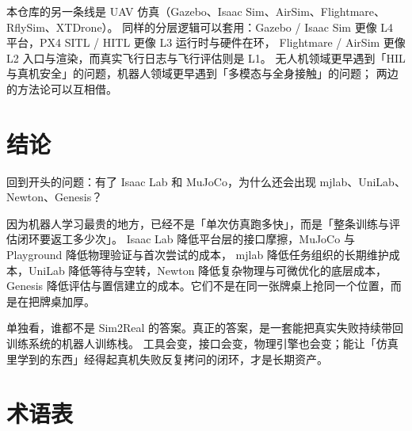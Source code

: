 \documentclass[UTF8, 11pt, a4paper, fontset=windows]{ctexart}
\begin{document}
本仓库的另一条线是 UAV 仿真（Gazebo、Isaac Sim、AirSim、Flightmare、RflySim、XTDrone）。
同样的分层逻辑可以套用：Gazebo / Isaac Sim 更像 L4 平台，PX4 SITL / HITL 更像 L3 运行时与硬件在环，
Flightmare / AirSim 更像 L2 入口与渲染，而真实飞行日志与飞行评估则是 L1。
无人机领域更早遇到「HIL 与真机安全」的问题，机器人领域更早遇到「多模态与全身接触」的问题；
两边的方法论可以互相借。

\section{结论}\label{sec:conclusion}

回到开头的问题：有了 Isaac Lab 和 MuJoCo，为什么还会出现 mjlab、UniLab、Newton、Genesis？

因为机器人学习最贵的地方，已经不是「单次仿真跑多快」，而是「整条训练与评估闭环要返工多少次」。
Isaac Lab 降低平台层的接口摩擦，MuJoCo 与 Playground 降低物理验证与首次尝试的成本，
mjlab 降低任务组织的长期维护成本，UniLab 降低等待与空转，Newton 降低复杂物理与可微优化的底层成本，
Genesis 降低评估与置信建立的成本。它们不是在同一张牌桌上抢同一个位置，而是在把牌桌加厚。

\begin{judgement}
单独看，谁都不是 Sim2Real 的答案。真正的答案，是一套能把真实失败持续带回训练系统的机器人训练栈。
工具会变，接口会变，物理引擎也会变；能让「仿真里学到的东西」经得起真机失败反复拷问的闭环，才是长期资产。
\end{judgement}

\appendix
\section{术语表}
\end{document}
